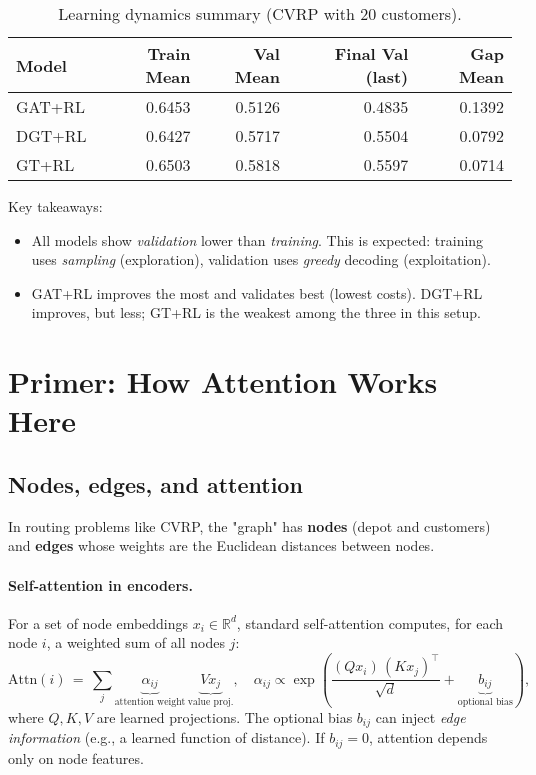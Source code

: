 \documentclass[11pt,a4paper]{article}
\begin{document}
\begin{table}[h]
  \centering
  \caption{Learning dynamics summary (CVRP with 20 customers).}
  \label{tab:dynamics}
  \begin{tabular}{lrrrr}
    \toprule
    Model & Train Mean & Val Mean & Final Val (last) & Gap Mean \\
    \midrule
    GAT+RL & 0.6453 & 0.5126 & 0.4835 & 0.1392 \\
    DGT+RL & 0.6427 & 0.5717 & 0.5504 & 0.0792 \\
    GT+RL  & 0.6503 & 0.5818 & 0.5597 & 0.0714 \\
    \bottomrule
  \end{tabular}
\end{table}

\noindent Key takeaways:
\begin{itemize}[leftmargin=*]
  \item All models show \emph{validation} lower than \emph{training}. This is expected: training uses \emph{sampling} (exploration), validation uses \emph{greedy} decoding (exploitation).
  \item GAT+RL improves the most and validates best (lowest costs). DGT+RL improves, but less; GT+RL is the weakest among the three in this setup.
\end{itemize}

\section{Primer: How Attention Works Here}
\subsection{Nodes, edges, and attention}
In routing problems like CVRP, the "graph" has \textbf{nodes} (depot and customers) and \textbf{edges} whose weights are the Euclidean distances between nodes.

\paragraph{Self-attention in encoders.} For a set of node embeddings $x_i \in \mathbb{R}^d$, standard self-attention computes, for each node $i$, a weighted sum of all nodes $j$:
\[
\text{Attn}(i) \,=\, \sum_{j} \underbrace{\alpha_{ij}}_{\text{attention weight}} \, \underbrace{V x_j}_{\text{value proj.}},\quad \alpha_{ij} \propto \exp\!\left(\frac{(Qx_i)\,(Kx_j)^\top}{\sqrt{d}} + \underbrace{b_{ij}}_{\text{optional bias}}\right),
\]
where $Q,K,V$ are learned projections. The optional bias $b_{ij}$ can inject \emph{edge information} (e.g., a learned function of distance). If $b_{ij}=0$, attention depends only on node features.
\end{document}
